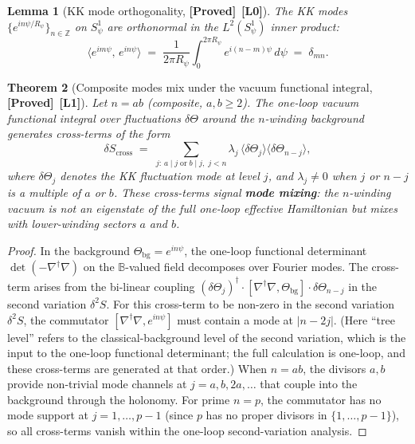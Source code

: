 \documentclass[12pt,a4paper]{article}
\newtheorem{theorem}{Theorem}[section]
\newtheorem{lemma}[theorem]{Lemma}
\theoremstyle{definition}
\theoremstyle{remark}
\newcommand{\BB}{\mathbb{B}}
\newcommand{\ZZ}{\mathbb{Z}}
\newcommand{\PROVED}{\textbf{[Proved]}}
\newcommand{\Lone}{\textbf{[L1]}}
\newcommand{\Lzero}{\textbf{[L0]}}
\begin{document}
\begin{lemma}[KK mode orthogonality, \PROVED\ \Lzero]
\label{lem:psp:ortho}
The KK modes $\{e^{in\psi/R_\psi}\}_{n \in \ZZ}$ on $S^1_\psi$ are orthonormal
in the $L^2(S^1_\psi)$ inner product:
\begin{equation}
  \bigl\langle e^{im\psi},\, e^{in\psi}\bigr\rangle
  \;=\; \frac{1}{2\pi R_\psi} \int_0^{2\pi R_\psi} e^{i(n-m)\psi}\,d\psi
  \;=\; \delta_{mn}.
  \label{eq:psp:ortho}
\end{equation}
\end{lemma}

\begin{theorem}[Composite modes mix under the vacuum functional integral, \PROVED\ \Lone]
\label{thm:psp:mixing}
Let $n = ab$ (composite, $a,b \geq 2$).
The one-loop vacuum functional integral over fluctuations $\delta\Theta$
around the $n$-winding background generates cross-terms of the form
\begin{equation}
  \delta S_{\mathrm{cross}}
  \;=\; \sum_{j:\, a \mid j \;\text{or}\; b\mid j,\; j < n}
        \lambda_j \,\langle\delta\Theta_j\rangle\langle\delta\Theta_{n-j}\rangle,
  \label{eq:psp:cross}
\end{equation}
where $\delta\Theta_j$ denotes the KK fluctuation mode at level $j$, and
$\lambda_j \neq 0$ when $j$ or $n-j$ is a multiple of $a$ or $b$.
These cross-terms signal \textbf{mode mixing}: the $n$-winding vacuum is not an
eigenstate of the full one-loop effective Hamiltonian but mixes with lower-winding
sectors $a$ and $b$.
\end{theorem}

\begin{proof}
In the background $\Theta_{\mathrm{bg}} = e^{in\psi}$, the one-loop functional
determinant $\det(-\nabla^\dagger\nabla)$ on the $\BB$-valued field decomposes
over Fourier modes.  The cross-term arises from the bi-linear coupling
$(\delta\Theta_{j})^\dagger \cdot [\nabla^\dagger\nabla, \Theta_{\mathrm{bg}}] \cdot \delta\Theta_{n-j}$
in the second variation $\delta^2 S$.
For this cross-term to be non-zero in the second variation $\delta^2 S$, the
commutator $[\nabla^\dagger\nabla, e^{in\psi}]$ must contain a mode at $|n - 2j|$.
(Here ``tree level'' refers to the classical-background level of the second
variation, which is the input to the one-loop functional determinant; the full
calculation is one-loop, and these cross-terms are generated at that order.)
When $n = ab$, the divisors $a,b$ provide non-trivial mode channels at $j = a,b,2a,\ldots$
that couple into the background through the holonomy.
For prime $n = p$, the commutator has no mode support at $j = 1, \ldots, p-1$
(since $p$ has no proper divisors in $\{1,\ldots,p-1\}$), so all cross-terms
vanish within the one-loop second-variation analysis.
\end{proof}
\end{document}
